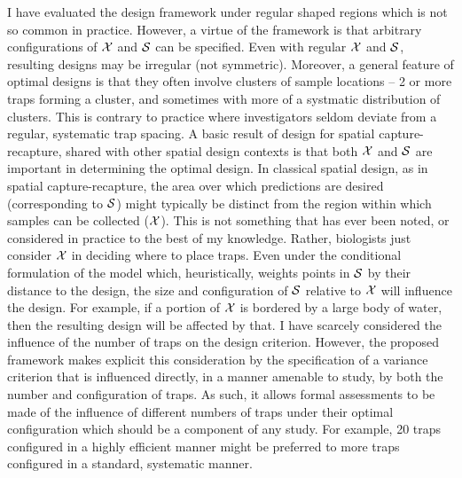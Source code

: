 \documentclass[useAMS,referee]{biom}
\begin{document}
I have evaluated the design framework 
under regular shaped regions which is not so
common in practice. However, a virtue of the framework is that arbitrary
configurations of ${\cal X}$ and ${\cal S}$ can be specified.
Even with regular ${\cal X}$ and ${\cal S}$, resulting designs may be
irregular (not symmetric). Moreover, a general feature of optimal
designs is that they 
often involve clusters of sample locations -- 2 or more traps forming
a cluster, and sometimes with  more of a systmatic distribution of clusters.
This is contrary to
practice where investigators seldom deviate from a regular, systematic
trap spacing.
A basic result of design for spatial capture-recapture, shared with
other spatial design contexts is that both ${\cal X}$ and ${\cal S}$
are important in determining the optimal design.  In classical spatial
design, as in spatial capture-recapture, the area over which
predictions are desired (corresponding to ${\cal S}$) might typically
be distinct from the region within which samples can be collected
(${\cal X}$).  
This is not something that has ever been
noted, or considered in practice to the best of my knowledge. Rather,
biologists just consider ${\cal X}$ in deciding where to place traps.
Even under the conditional formulation of the model which,
heuristically, weights points in ${\cal S}$ by their distance to the
design, the size and configuration of ${\cal S}$ relative to ${\cal
  X}$ will influence the design.  For example, if a portion of ${\cal
  X}$ is bordered by a large body of water, then the resulting design
will be affected by that.
I have scarcely considered the influence of the number of traps on the
design criterion.
However, the proposed framework makes explicit this consideration
by the specification of a variance criterion that is influenced
directly, in a manner amenable to study, by both the number and
configuration of traps.
As such, it 
allows formal assessments to be made of the influence of different numbers
of traps under their optimal configuration which should be a component
of any study.  For example, 20 traps configured in a highly efficient
manner might be preferred to more traps configured in a standard, 
systematic manner. 
\end{document}
